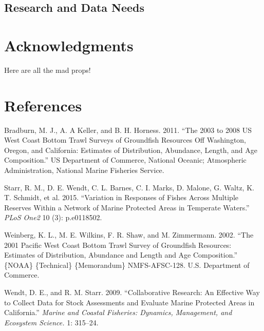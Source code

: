 \documentclass[11pt,
  english,
  letterpaper,
]{article}
\newlength{\cslhangindent}
\newenvironment{CSLReferences}[2] %
 {%
  \setlength{\parindent}{0pt}
  \ifodd #1 \everypar{\setlength{\hangindent}{\cslhangindent}}\ignorespaces\fi
  \ifnum #2 > 0
  \setlength{\parskip}{#2\baselineskip}
  \fi
 }%
 {}
\begin{document}
\hypertarget{research-and-data-needs-1}{%
\subsection{Research and Data Needs}\label{research-and-data-needs-1}}

\hypertarget{acknowledgments}{%
\section{Acknowledgments}\label{acknowledgments}}

Here are all the mad props!

\clearpage

\hypertarget{references}{%
\section{References}\label{references}}

\hypertarget{refs}{}
\begin{CSLReferences}{1}{0}
\leavevmode{}%
Bradburn, M. J., A. A Keller, and B. H. Horness. 2011. {``The 2003 to 2008 {US} {West} {Coast} Bottom Trawl Surveys of Groundfish Resources Off {Washington}, {Oregon}, and {California}: Estimates of Distribution, Abundance, Length, and Age Composition.''} US Department of Commerce, National Oceanic; Atmospheric Administration, National Marine Fisheries Service.

\leavevmode{}%
Starr, R. M., D. E. Wendt, C. L. Barnes, C. I. Marks, D. Malone, G. Waltz, K. T. Schmidt, et al. 2015. {``Variation in Responses of Fishes Across Multiple Reserves Within a Network of Marine Protected Areas in Temperate Waters.''} \emph{PLoS One2} 10 (3): p.e0118502.

\leavevmode{}%
Weinberg, K. L., M. E. Wilkins, F. R. Shaw, and M. Zimmermann. 2002. {``The 2001 {Pacific} {West} {Coast} Bottom Trawl Survey of Groundfish Resources: Estimates of Distribution, Abundance and Length and Age Composition.''} \{NOAA\} \{Technical\} \{Memorandum\} NMFS-AFSC-128. U.S. Department of Commerce.

\leavevmode{}%
Wendt, D. E., and R. M. Starr. 2009. {``Collaborative Research: An Effective Way to Collect Data for Stock Assessments and Evaluate Marine Protected Areas in {C}alifornia.''} \emph{Marine and Coastal Fisheries: Dynamics, Management, and Ecosystem Science.} 1: 315--24.

\end{CSLReferences}
\end{document}
